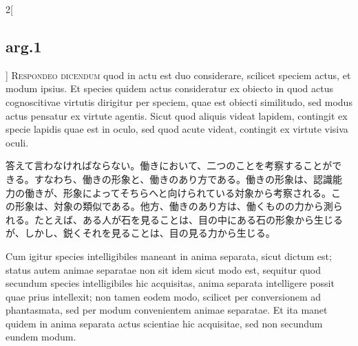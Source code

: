 \documentclass[paper=a4paper,fontsize=10pt,jafontsize=9pt,titlepage]{jlreq}
\begin{document}
\begin{paracol}{2}[\subsection{arg.1}]
{\scshape Respondeo dicendum} quod in actu est duo considerare, scilicet
speciem actus, et modum ipsius. Et species quidem actus consideratur
ex obiecto in quod actus cognoscitivae virtutis dirigitur
per speciem, quae est obiecti similitudo, sed modus actus pensatur
ex virtute agentis. Sicut quod aliquis videat lapidem, contingit ex
specie lapidis quae est in oculo, sed quod acute videat, contingit ex
virtute visiva oculi.

\switchcolumn

答えて言わなければならない。働きにおいて、二つのことを考察することがで
きる。すなわち、働きの形象と、働きのあり方である。働きの形象は、認識能
力の働きが、形象によってそちらへと向けられている対象から考察される。こ
の形象は、対象の類似である。他方、働きのあり方は、働くものの力から測ら
れる。たとえば、ある人が石を見ることは、目の中にある石の形象から生じる
が、しかし、鋭くそれを見ることは、目の見る力から生じる。

\switchcolumn*

Cum igitur species intelligibiles maneant in anima separata, sicut
dictum est; status autem animae separatae non sit idem sicut modo est,
sequitur quod secundum species intelligibiles hic acquisitas, anima
separata intelligere possit quae prius intellexit; non tamen eodem
modo, scilicet per conversionem ad phantasmata, sed per modum
convenientem animae separatae. Et ita manet quidem in anima separata
actus scientiae hic acquisitae, sed non secundum eundem modum.


\end{paracol}
\end{document}
